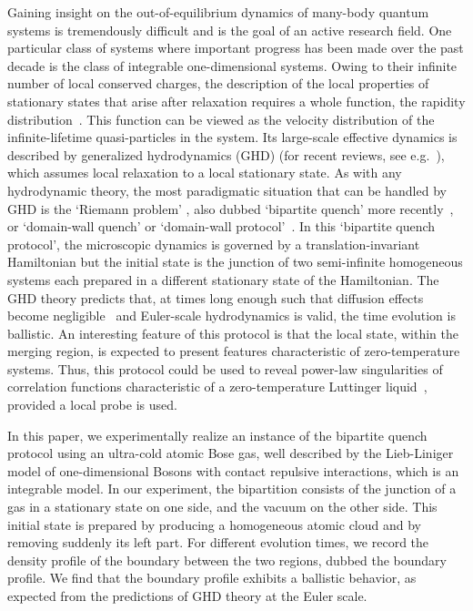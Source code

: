 Gaining insight on the out-of-equilibrium dynamics of many-body quantum systems is tremendously difficult and is the goal of an active research field.  
One particular class of systems where important progress has been made over the past decade is the class of integrable one-dimensional systems. 
Owing to their infinite number of local conserved charges, the description of the local properties of stationary states that arise after relaxation requires a whole function, the rapidity distribution~\cite{yang1969thermodynamics,zamolodchikov1990thermodynamic,rigol2007relaxation,mossel2012generalized,caux2012constructing,fagotti2013reduced,ilievski2016string}.
This function can be viewed as the velocity distribution of the infinite-lifetime quasi-particles in the system.   Its large-scale effective dynamics is described by  generalized hydrodynamics (GHD) \cite{bertini_transport_2016,castro-alvaredo_emergent_2016} (for recent reviews, see e.g.~\cite{bastianello2022introduction,doyon2025generalized}), which assumes local relaxation to a local stationary state.
As with any hydrodynamic theory, the most paradigmatic situation that can be handled by GHD is the `Riemann problem' \cite{riemann1860fortpflanzung}, also dubbed `bipartite quench' more recently~\cite{de_nardis_edge_2018,horvath2019hydrodynamics,alba2019entanglement,rylands2023transport,gamayun2023landauer,horvath2024full}, or `domain-wall quench' or `domain-wall protocol'~\cite{yuan2007domain,antal1999transport,hauschild2016domain,collura2018analytic,misguich2019domain,scopa2022exact,collura2020domain,scopa2023scaling,mcroberts2024domain}. In this `bipartite quench protocol', the microscopic dynamics is governed by a translation-invariant Hamiltonian but the initial state is the junction of two semi-infinite homogeneous systems each prepared in a different stationary state of the Hamiltonian. The GHD theory predicts that, at times long enough such that diffusion effects become negligible~\cite{de_nardis_diffusion_2019} and Euler-scale hydrodynamics is valid, the time evolution is ballistic. 
An interesting feature of this protocol is that the local state, within the merging region, is expected to present features characteristic of zero-temperature systems. Thus, this protocol could be used to reveal power-law singularities of correlation functions characteristic of a zero-temperature Luttinger liquid~\cite{de_nardis_edge_2018}, provided a local probe is used. 

In this paper, we experimentally realize an instance of the bipartite quench protocol using an ultra-cold atomic Bose gas, well described by the Lieb-Liniger model of one-dimensional Bosons with contact repulsive interactions\cite{lieb_exact_1963,bouchoule_generalized_2022}, which is an integrable model. 
In our experiment, the bipartition consists of the junction of a gas in a stationary state on one side, and the vacuum on the other side. This initial state is prepared by producing a homogeneous atomic cloud and by removing suddenly its left part. For different evolution times, we record the density profile of the boundary between the two regions, dubbed the boundary profile.  We find that the boundary profile exhibits a ballistic behavior, as expected from the predictions of GHD theory at the Euler scale. 


